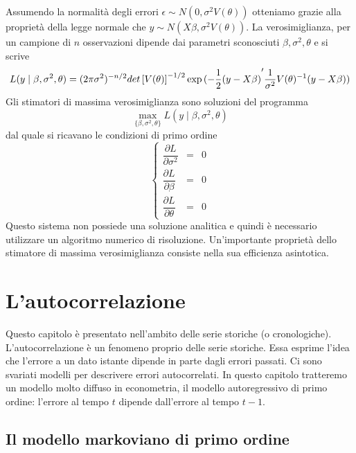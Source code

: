\documentclass[a4paper]{report}
\newcounter{ese}
\theoremstyle{remark}
\begin{document}
Assumendo la normalit\`{a} degli errori $\epsilon \sim N(0,\sigma
^{2}V(\theta ))$ otteniamo grazie alla propriet\`{a} della legge normale che 
$y\sim N(X\beta ,\sigma ^{2}V(\theta ))$. La verosimiglianza, per un
campione di $n$ osservazioni dipende dai parametri sconosciuti $\beta
,\sigma ^{2},\theta $ e si scrive 
\begin{equation*}
L(y\mid \beta ,\sigma ^{2},\theta )=(2\pi \sigma ^{2})^{-n/2}det\left[
V(\theta )\right] ^{-1/2}\exp {(-\frac{1}{2}(y-X\beta )}^{\prime }{\frac{1}{%
\sigma ^{2}}V(\theta )^{-1}(y-X\beta ))}
\end{equation*}%
Gli stimatori di massima verosimiglianza sono soluzioni del programma 
\begin{equation*}
\underset{\{\beta ,\sigma ^{2},\theta \}}{\max }L(y\mid \beta ,\sigma
^{2},\theta )
\end{equation*}%
dal quale si ricavano le condizioni di primo ordine 
\begin{equation*}
\left\{ 
\begin{array}{ccc}
\dfrac{\partial L}{\partial \sigma ^{2}} & = & 0 \\ 
\dfrac{\partial L}{\partial \beta } & = & 0 \\ 
\dfrac{\partial L}{\partial \theta } & = & 0%
\end{array}%
\right.
\end{equation*}%
Questo sistema non possiede una soluzione analitica e quindi \`{e}
necessario utilizzare un algoritmo numerico di risoluzione. Un'importante
propriet\`{a} dello stimatore di massima verosimiglianza consiste nella sua
efficienza asintotica.

\chapter{L'autocorrelazione\label{capitolo autocorrelazione}}

Questo capitolo \`{e} presentato nell'ambito delle serie storiche (o
cronologiche). L'autocorrelazione \`{e} un fenomeno proprio delle serie
storiche. Essa esprime l'idea che l'errore a un dato istante dipende in
parte dagli errori passati. Ci sono svariati modelli per descrivere errori
autocorrelati. In questo capitolo tratteremo un modello molto diffuso in
econometria, il modello autoregressivo di primo ordine: l'errore al tempo $t$
dipende dall'errore al tempo $t-1$.

\section{Il modello markoviano di primo ordine}
\end{document}
